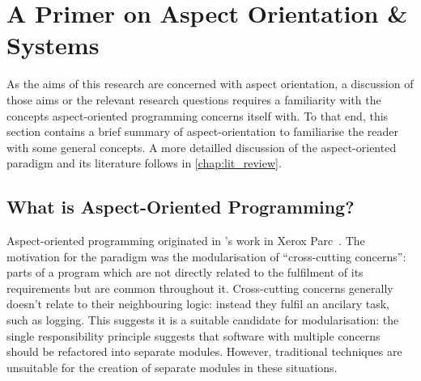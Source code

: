 




\section{A Primer on Aspect Orientation \& \SocioTechnical Systems}

As the aims of this research are concerned with aspect orientation, a discussion of
those aims or the relevant research questions requires a familiarity with the concepts
aspect-oriented programming concerns itself with. To that end, this 
section contains a brief summary of aspect-orientation to familiarise the reader
with some general concepts. A more detailled discussion of the aspect-oriented
paradigm and its literature follows in \cref{chap:lit_review}.



\subsection{What is Aspect-Oriented Programming?}

Aspect-oriented programming originated in \citeauthor{kiczales1997aspect}'s work 
in Xerox Parc~\cite{kiczales1997aspect}. The motivation for the paradigm was the 
modularisation of ``cross-cutting concerns'': parts of a program which are not
directly related to the fulfilment of its requirements but are common throughout it.
Cross-cutting concerns generally doesn't relate to
their neighbouring logic: instead they fulfil an ancilary task, such as logging.
This suggests it is a suitable candidate for modularisation: the single responsibility
principle suggests that software with multiple concerns
should be refactored into separate modules. However, traditional techniques are unsuitable
for the creation of separate modules in these situations.

